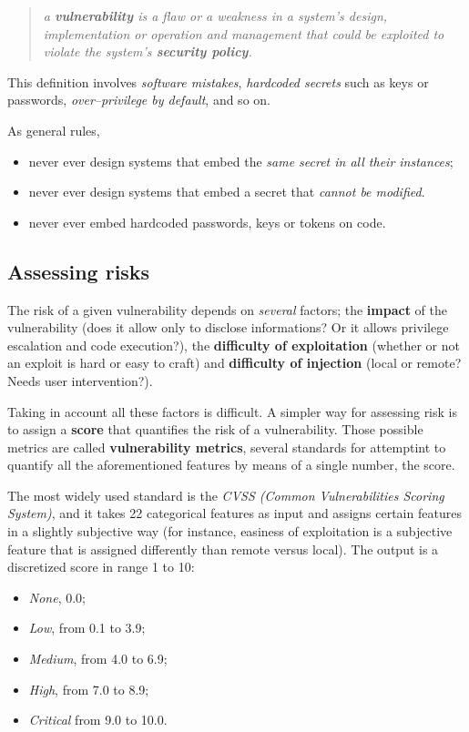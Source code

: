\documentclass[10pt]{\classname}
\begin{document}
\begin{quote}
    \emph{a \textbf{vulnerability} is a flaw or a weakness in a system's
    design, implementation or operation and management that could be exploited
to violate the system's \textbf{security policy}.}
\end{quote}

This definition involves \emph{software mistakes}, \emph{hardcoded secrets}
such as keys or passwords, \emph{over--privilege by default}, and so on.

As general rules,
\begin{itemize}
    \item never ever design systems that embed the \emph{same secret in all
        their instances};
    \item never ever design systems that embed a secret that \emph{cannot be
        modified}.
    \item never ever embed hardcoded passwords, keys or tokens on code.
\end{itemize}

\subsection{Assessing risks}

The risk of a given vulnerability depends on \emph{several} factors; the
\textbf{impact} of the vulnerability (does it allow only to disclose
informations? Or it allows privilege escalation and code execution?), the \textbf{difficulty of exploitation} (whether or not an exploit is hard or easy to craft) and \textbf{difficulty of injection} (local or remote? Needs user intervention?).

Taking in account all these factors is difficult. A simpler way for assessing
risk is to assign a \textbf{score} that quantifies the risk of a vulnerability.
Those possible metrics are called \textbf{vulnerability metrics}, several
standards for attemptint to quantify all the aforementioned features by means
of a single number, the score. 

The most widely used standard is the \emph{CVSS (Common Vulnerabilities Scoring
System)}, and it takes 22 categorical features as input and assigns certain
features in a slightly subjective way (for instance, easiness of exploitation
is a subjective feature that is assigned differently than remote versus local).
The output is a discretized score in range 1 to 10:
\begin{itemize}
    \item \emph{None}, 0.0;
    \item \emph{Low}, from 0.1 to 3.9;
    \item \emph{Medium}, from 4.0 to 6.9;
    \item \emph{High}, from 7.0 to 8.9;
    \item \emph{Critical} from 9.0 to 10.0.
\end{itemize}
\end{document}
